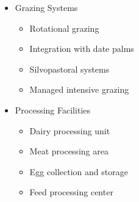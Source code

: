 \begin{itemize}
\begin{itemize}
        \item Grazing Systems
        \begin{itemize}
            \item Rotational grazing
            \item Integration with date palms
            \item Silvopastoral systems
            \item Managed intensive grazing
        \end{itemize}
        
        \item Processing Facilities
        \begin{itemize}
            \item Dairy processing unit
            \item Meat processing area
            \item Egg collection and storage
            \item Feed processing center
        \end{itemize}
    \end{itemize}
\end{itemize}

